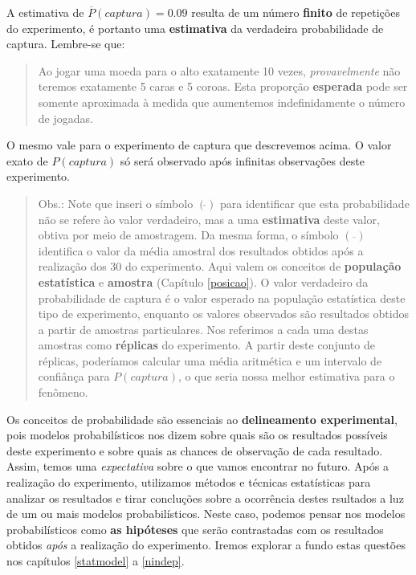 \documentclass[
]{book}
\begin{document}
A estimativa de \(\overline{P}(captura) = 0.09\) resulta de um número \textbf{finito} de repetições do experimento, é portanto uma \textbf{estimativa} da verdadeira probabilidade de captura. Lembre-se que:

\begin{quote}
Ao jogar uma moeda para o alto exatamente 10 vezes, \emph{provavelmente} não teremos exatamente 5 caras e 5 coroas. Esta proporção \textbf{esperada} pode ser somente aproximada à medida que aumentemos indefinidamente o número de jogadas.
\end{quote}

O mesmo vale para o experimento de captura que descrevemos acima. O valor exato de \(P(captura)\) só será observado após infinitas observações deste experimento.

\begin{quote}
Obs.: Note que inseri o símbolo \((\hat{})\) para identificar que esta probabilidade não se refere ào valor verdadeiro, mas a uma \textbf{estimativa} deste valor, obtiva por meio de amostragem. Da mesma forma, o símbolo \((\overline{})\) identifica o valor da média amostral dos resultados obtidos após a realização dos 30 do experimento. Aqui valem os conceitos de \textbf{população estatística} e \textbf{amostra} (Capítulo \ref{posicao}). O valor verdadeiro da probabilidade de captura é o valor esperado na população estatística deste tipo de experimento, enquanto os valores observados são resultados obtidos a partir de amostras particulares. Nos referimos a cada uma destas amostras como \textbf{réplicas} do experimento. A partir deste conjunto de réplicas, poderíamos calcular uma média aritmética e um intervalo de confiânça para \(P(captura)\), o que seria nossa melhor estimativa para o fenômeno.
\end{quote}

Os conceitos de probabilidade são essenciais ao \textbf{delineamento experimental}, pois modelos probabilísticos nos dizem sobre quais são os resultados possíveis deste experimento e sobre quais as chances de observação de cada resultado. Assim, temos uma \emph{expectativa} sobre o que vamos encontrar no futuro. Após a realização do experimento, utilizamos métodos e técnicas estatísticas para analizar os resultados e tirar concluções sobre a ocorrência destes rsultados a luz de um ou mais modelos probabilísticos. Neste caso, podemos pensar nos modelos probabilísticos como \textbf{as hipóteses} que serão contrastadas com os resultados obtidos \emph{após} a realização do experimento. Iremos explorar a fundo estas questões nos capítulos \ref{statmodel} a \ref{nindep}.
\end{document}
